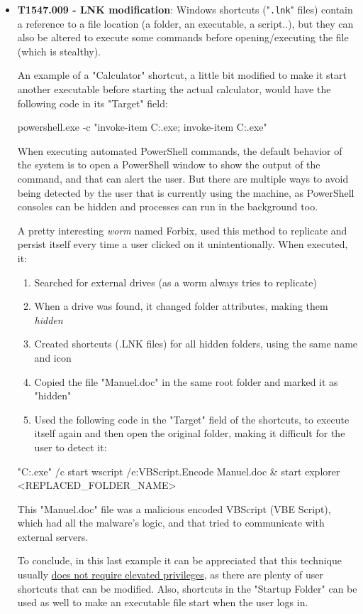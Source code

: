 \begin{itemize}
\bigskip

\item \textbf{T1547.009 - LNK modification}: Windows shortcuts ("\texttt{.lnk}" files) contain a reference to a file location\cite{Shortcut} (a folder, an executable, a script..), but they can also be altered to execute some commands before opening/executing the file (which is stealthy).

An example of a "Calculator" shortcut, a little bit modified to make it start another executable before starting the actual calculator, would have the following code in its "Target" field:
\vspace{7pt}
\begin{spverbatim} 
powershell.exe -c "invoke-item C:\Temp\mal.exe; invoke-item C:\Windows{}\calc.exe"
\end{spverbatim}
\vspace{7pt}

When executing automated PowerShell commands, the default behavior of the system is to open a PowerShell window to show the output of the command, and that can alert the user. But there are multiple ways to avoid being detected by the user that is currently using the machine, as PowerShell consoles can be hidden and processes can run in the background too. 

\pagebreak
A pretty interesting \textit{worm} named Forbix\cite{ForbixLNK}, used this method to replicate and persist itself every time a user clicked on it unintentionally. When executed, it:
\begin{enumerate}
\item Searched for external drives (as a worm always tries to replicate)
\item When a drive was found, it changed folder attributes, making them \textit{hidden}
\item Created shortcuts (.LNK files) for all hidden folders, using the same name and icon
\item Copied the file "Manuel.doc" in the same root folder and marked it as "hidden"
\item Used the following code in the "Target" field of the shortcuts, to execute itself again and then open the original folder, making it difficult for the user to detect it:
\end{enumerate} 
\begin{spverbatim}
"C:\Windows{}\cmd.exe" /c start wscript /e:VBScript.Encode Manuel.doc & start explorer <REPLACED_FOLDER_NAME>
\end{spverbatim}
\vspace{7pt}

This "Manuel.doc" file was a malicious encoded VBScript (VBE Script), which had all the malware's logic, and that tried to communicate with external servers.

To conclude, in this last example it can be appreciated that this technique usually \underline{does not require elevated privileges}, as there are plenty of user shortcuts that can be modified. Also, shortcuts in the "Startup Folder" can be used as well to make an executable file start when the user logs in.
\end{itemize}

